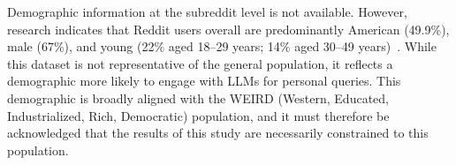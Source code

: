 Demographic information at the subreddit level is not available. However, research indicates that Reddit users overall are predominantly American (49.9\%), male (67\%), and young (22\% aged 18--29 years; 14\% aged 30--49 years)~\cite{pew-reddit-research,statista-reddit}. While this dataset is not representative of the general population, it reflects a demographic more likely to engage with LLMs for personal queries. This demographic is broadly aligned with the WEIRD (Western, Educated, Industrialized, Rich, Democratic) population, and it must therefore be acknowledged that the results of this study are necessarily constrained to this population.

